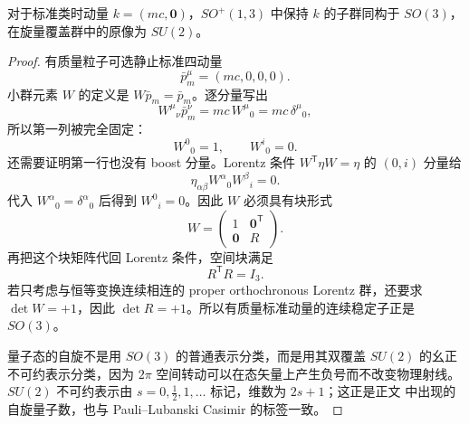 \begin{theorem}[有质量小群]
对于标准类时动量 $k=(mc,\mathbf0)$，$SO^+(1,3)$ 中保持 $k$ 的子群同构于 $SO(3)$，在旋量覆盖群中的原像为 $SU(2)$。
\end{theorem}
\begin{proof}
有质量粒子可选静止标准四动量
\begin{equation*}
 \bar p_m^\mu=(mc,0,0,0).
\end{equation*}
小群元素 $W$ 的定义是 $W\bar p_m=\bar p_m$。逐分量写出
\begin{equation*}
 W^\mu{}_{\nu}\bar p_m^\nu
 =mc\,W^\mu{}_0
 =mc\,\delta^\mu{}_0,
\end{equation*}
所以第一列被完全固定：
\begin{equation*}
 W^0{}_0=1,
 \qquad
 W^i{}_0=0.
\end{equation*}
还需要证明第一行也没有 boost 分量。Lorentz 条件
$W^{\mathsf T}\eta W=\eta$ 的 $(0,i)$ 分量给
\begin{equation*}
 \eta_{\alpha\beta}W^\alpha{}_0W^\beta{}_i=0.
\end{equation*}
代入 $W^\alpha{}_0=\delta^\alpha{}_0$ 后得到
$W^0{}_i=0$。因此 $W$ 必须具有块形式
\begin{equation*}
 W=
 \begin{pmatrix}
 1&\mathbf0^{\mathsf T}\\
 \mathbf0&R
 \end{pmatrix}.
\end{equation*}
再把这个块矩阵代回 Lorentz 条件，空间块满足
\begin{equation*}
 R^{\mathsf T}R=I_3.
\end{equation*}
若只考虑与恒等变换连续相连的 proper orthochronous Lorentz 群，还要求
$\det W=+1$，因此 $\det R=+1$。所以有质量标准动量的连续稳定子正是
$SO(3)$。

量子态的自旋不是用 $SO(3)$ 的普通表示分类，而是用其双覆盖 $SU(2)$ 的幺正不可约表示分类，因为 $2\pi$ 空间转动可以在态矢量上产生负号而不改变物理射线。$SU(2)$ 不可约表示由
$s=0,\tfrac12,1,\ldots$ 标记，维数为 $2s+1$；这正是正文 中出现的自旋量子数，也与 Pauli--Lubanski Casimir 的标签一致。
\end{proof}

